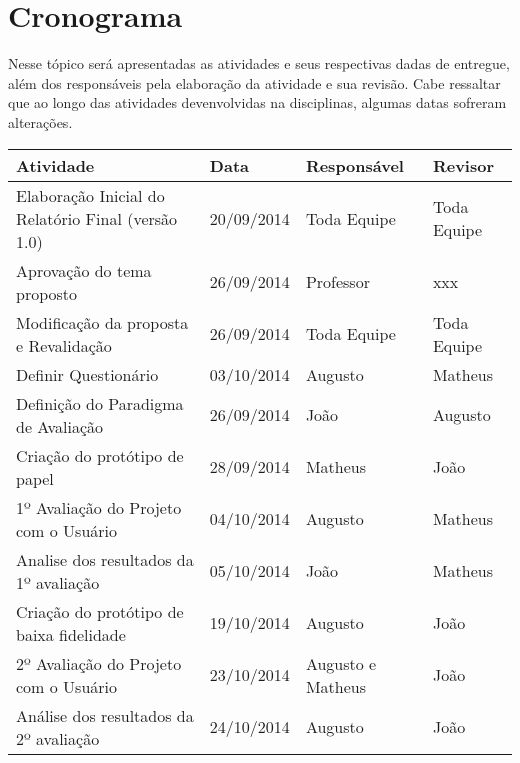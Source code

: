 \chapter[Cronograma]{Cronograma}
\label{chap:cronograma}
	Nesse tópico será apresentadas as atividades e seus respectivas dadas de entregue, além dos responsáveis pela elaboração da atividade e sua revisão. Cabe ressaltar que ao longo das atividades devenvolvidas na disciplinas, algumas datas sofreram alterações.
	
	\label{subsubsec:cronograma_talbe}
		\begin{table}[h]
			\centering
			\begin{tabular}{|p{6.5cm}|p{2.5cm}|p{2.5cm}|p{2.5cm}|}
				\hline
				
				Atividade & Data & Responsável & Revisor \\ \hline
				
				Elaboração Inicial do Relatório Final (versão 1.0) & 20/09/2014 & Toda Equipe & Toda Equipe \\ \hline
				
				Aprovação do tema proposto & 26/09/2014 & Professor & xxx \\ \hline
				
				Modificação da proposta e Revalidação & 26/09/2014 & Toda Equipe & Toda Equipe  \\ \hline

				Definir Questionário & 03/10/2014 & Augusto & Matheus \\ \hline

				Definição do Paradigma de Avaliação & 26/09/2014 & João & Augusto \\ \hline

				Criação do protótipo de papel & 28/09/2014 & Matheus & João \\ \hline

				1º Avaliação do Projeto com o Usuário & 04/10/2014 & Augusto & Matheus \\ \hline

				Analise dos resultados da 1º avaliação & 05/10/2014 & João & Matheus \\ \hline

				Criação do protótipo de baixa fidelidade & 19/10/2014 & Augusto & João \\ \hline

				2º Avaliação do Projeto com o Usuário & 23/10/2014 & Augusto e Matheus & João \\ \hline

				Análise dos resultados da 2º avaliação & 24/10/2014 & Augusto & João \\ \hline


\end{tabular}
\end{table}
